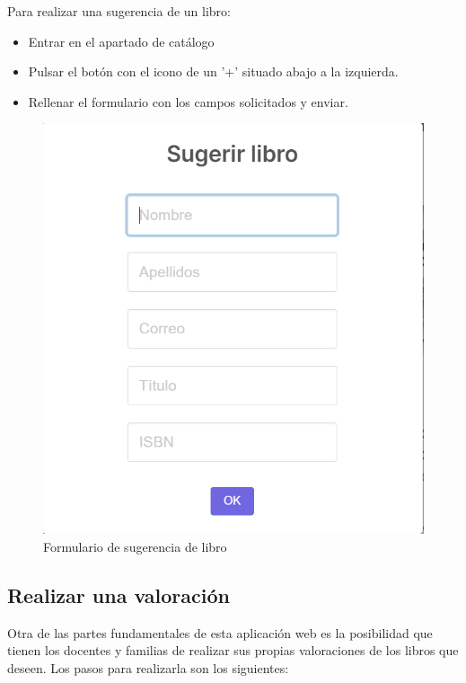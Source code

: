 Para realizar una sugerencia de un libro:
\begin{itemize}
    \item Entrar en el apartado de catálogo
    \item Pulsar el botón con el icono de un '+' situado abajo a la izquierda.
    \item Rellenar el formulario con los campos solicitados y enviar.
\end{itemize}
\begin{figure}[h]
    \centering
    \includegraphics[width=0.6\linewidth]{Imagenes/ManualSugerencia.png}
    \caption{Formulario de sugerencia de libro}
    \label{Formulario de sugerencia de libro}
\end{figure}
\FloatBarrier

\subsection{Realizar una valoración}
Otra de las partes fundamentales de esta aplicación web es la posibilidad que tienen los docentes y familias de realizar sus propias valoraciones de los libros que deseen. Los pasos para realizarla son los siguientes:

